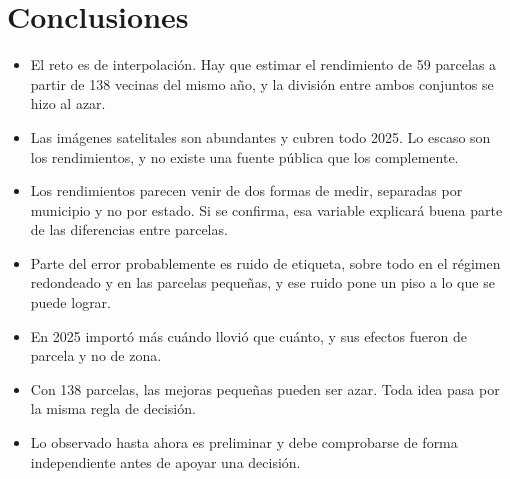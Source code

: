 \section{Conclusiones}\label{sec:conclusiones}

\begin{itemize}
  \item El reto es de interpolación. Hay que estimar el rendimiento de 59 parcelas a partir de 138 vecinas del mismo
        año, y la división entre ambos conjuntos se hizo al azar.
  \item Las imágenes satelitales son abundantes y cubren todo 2025. Lo escaso son los rendimientos, y no existe una
        fuente pública que los complemente.
  \item Los rendimientos parecen venir de dos formas de medir, separadas por municipio y no por estado. Si se
        confirma, esa variable explicará buena parte de las diferencias entre parcelas.
  \item Parte del error probablemente es ruido de etiqueta, sobre todo en el régimen redondeado y en las parcelas
        pequeñas, y ese ruido pone un piso a lo que se puede lograr.
  \item En 2025 importó más cuándo llovió que cuánto, y sus efectos fueron de parcela y no de zona.
  \item Con 138 parcelas, las mejoras pequeñas pueden ser azar. Toda idea pasa por la misma regla de decisión.
  \item Lo observado hasta ahora es preliminar y debe comprobarse de forma independiente antes de apoyar una
        decisión.
\end{itemize}
